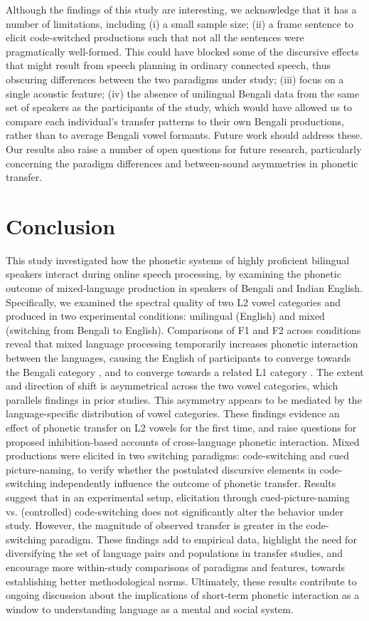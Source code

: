 \documentclass[12 pt]{article}
\newcommand{\nt}[1]{\textipa{[#1]}} %
\begin{document}
Although the findings of this study are interesting, we acknowledge that it has a number of limitations, including (i) a small sample size; (ii) a frame sentence to elicit code-switched productions such that not all the sentences were pragmatically well-formed. This could have blocked some of the discursive effects that might result from speech planning in ordinary connected speech, thus obscuring differences between the two paradigms under study; (iii) focus on a single acoustic feature; (iv) the absence of unilingual Bengali data from the same set of speakers as the participants of the study, which would have allowed us to compare each individual's transfer patterns to their own Bengali productions, rather than to average Bengali vowel formants. Future work should address these. Our results also raise a number of open questions for future research, particularly concerning the paradigm differences and between-sound asymmetries in phonetic transfer.   


\section{Conclusion}
This study investigated how the phonetic systems of highly proficient bilingual speakers interact during online speech processing, by examining the phonetic outcome of mixed-language production in speakers of Bengali and Indian English. Specifically, we examined the spectral quality of two L2 vowel categories \nt{2} and \nt{\ae} produced in two experimental conditions: unilingual (English) and mixed (switching from Bengali to English).
Comparisons of F1 and F2 across conditions reveal that mixed language processing temporarily increases phonetic interaction between the languages, causing the English \nt{\ae} of participants to converge towards the Bengali category \nt{\ae}, and \nt{2} to converge towards a related L1 category \nt{a:}. The extent and direction of shift is asymmetrical across the two vowel categories, which parallels findings in prior studies. This asymmetry appears to be mediated by the language-specific distribution of vowel categories. These findings evidence an effect of phonetic transfer on L2 vowels for the first time, and raise questions for proposed inhibition-based accounts of cross-language phonetic interaction. Mixed productions were elicited in two switching paradigms: code-switching and cued picture-naming, to verify whether the postulated discursive elements in code-switching independently influence the outcome of phonetic transfer. Results suggest that in an experimental setup, elicitation through cued-picture-naming vs. (controlled) code-switching does not significantly alter the behavior under study. However, the magnitude of observed transfer is greater in the code-switching paradigm. These findings add to empirical data, highlight the need for diversifying the set of language pairs and populations in transfer studies, and encourage more within-study comparisons of paradigms and features, towards establishing better methodological norms. Ultimately, these results contribute to ongoing discussion about the implications of short-term phonetic interaction as a window to understanding language as a mental and social system.
\end{document}
